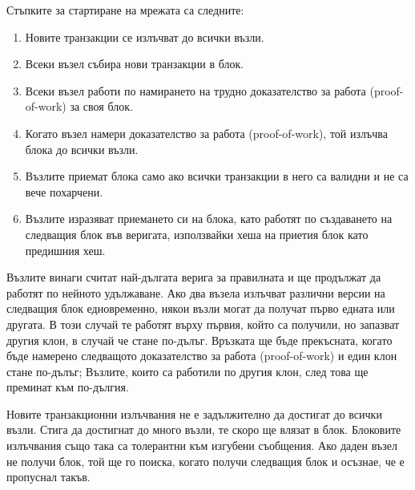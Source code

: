 \documentclass[11pt,a4paper]{article}
\begin{document}
Стъпките за стартиране на мрежата са следните:

\begin{enumerate}
	\item Новите транзакции се излъчват до всички възли.
	\item Всеки възел събира нови транзакции в блок.
	\item Всеки възел работи по намирането на трудно доказателство за работа (proof-of-work) за своя блок.
	\item Когато възел намери доказателство за работа (proof-of-work), той излъчва блока до всички възли.
	\item Възлите приемат блока само ако всички транзакции в него са валидни и не са вече похарчени.
	\item Възлите изразяват приемането си на блока, като работят по създаването на следващия блок във веригата, използвайки хеша на приетия блок като предишния хеш.
\end{enumerate}

Възлите винаги считат най-дългата верига за правилната и ще продължат да работят по нейното удължаване. Ако два възела излъчват различни версии на следващия блок едновременно, някои възли могат да получат първо едната или другата. В този случай те работят върху първия, който са получили, но запазват другия клон, в случай че стане по-дълъг. Връзката ще бъде прекъсната, когато бъде намерено следващото доказателство за работа (proof-of-work) и един клон стане по-дълъг; Възлите, които са работили по другия клон, след това ще преминат към по-дългия.

Новите транзакционни излъчвания не е задължително да достигат до всички възли. Стига да достигнат до много възли, те скоро ще влязат в блок. Блоковите излъчвания също така са толерантни към изгубени съобщения. Ако даден възел не получи блок, той ще го поиска, когато получи следващия блок и осъзнае, че е пропуснал такъв.
\end{document}
